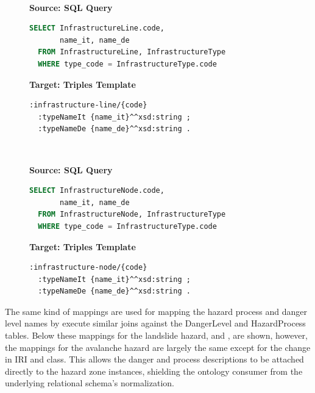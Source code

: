 \begin{figure}[ht!]
  \vspace*{-1mm}
  \textbf{\small{}} \\
  \begin{minipage}[t]{0.50\textwidth}
    \centering
    \textbf{\scriptsize Source: SQL Query}
\begin{lstlisting}[language=SQL]
SELECT InfrastructureLine.code,
       name_it, name_de
  FROM InfrastructureLine, InfrastructureType
  WHERE type_code = InfrastructureType.code
\end{lstlisting}
  \end{minipage}
  \hfill
  \begin{minipage}[t]{0.50\textwidth}
    \centering
    \textbf{\scriptsize Target: Triples Template}
\begin{lstlisting}[language=Turtle]
:infrastructure-line/{code}
  :typeNameIt {name_it}^^xsd:string ;
  :typeNameDe {name_de}^^xsd:string . 
\end{lstlisting}
  \end{minipage}
  \vspace*{-4mm}
\end{figure}

\begin{figure}[ht!]
  \vspace*{-1mm}
  \textbf{\small{}} \\
  \begin{minipage}[t]{0.50\textwidth}
    \centering
    \textbf{\scriptsize Source: SQL Query}
\begin{lstlisting}[language=SQL]
SELECT InfrastructureNode.code,
       name_it, name_de
  FROM InfrastructureNode, InfrastructureType
  WHERE type_code = InfrastructureType.code
\end{lstlisting}
  \end{minipage}
  \hfill
  \begin{minipage}[t]{0.50\textwidth}
    \centering
    \textbf{\scriptsize Target: Triples Template}
\begin{lstlisting}[language=Turtle]
:infrastructure-node/{code}
  :typeNameIt {name_it}^^xsd:string ;
  :typeNameDe {name_de}^^xsd:string . 
\end{lstlisting}
  \end{minipage}
  \vspace*{-4mm}
\end{figure}

The same kind of mappings are used for mapping the hazard process and danger level names by execute similar joins against the DangerLevel and HazardProcess tables. Below these mappings for the landslide hazard,  and , are shown, however, the mappings for the avalanche hazard are largely the same except for the change in IRI and class. This allows the danger and process descriptions to be attached directly to the hazard zone instances, shielding the ontology consumer from the underlying relational schema's normalization.

